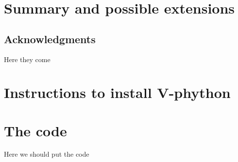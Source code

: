 \documentclass[12pt]{iopart}
\begin{document}
\section{Summary and possible extensions}

%



\subsection{Acknowledgments}
Here they come

\appendix
\section{Instructions to install V-phython}

\section{The code}
Here we should put the code
 



\end{document}
